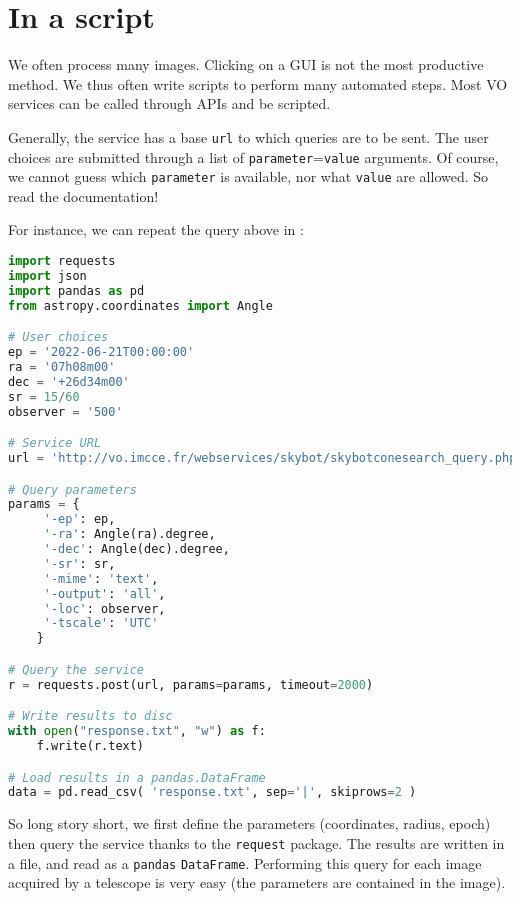 



\section{In a script}

We often process many images. Clicking on a GUI is not the most
productive method. We thus often write scripts to perform
many automated steps. Most VO services can be called through APIs
and be scripted.

Generally, the service has a base \texttt{url} to which queries are
to be sent. The user choices are submitted through a list of \texttt{parameter}=\texttt{value}
arguments. Of course, we cannot guess which \texttt{parameter} is
available, nor what \texttt{value} are allowed. So read the documentation!

For instance, we can repeat the query above in \python:

\begin{lstlisting}[language=python]
import requests
import json
import pandas as pd
from astropy.coordinates import Angle

# User choices
ep = '2022-06-21T00:00:00'
ra = '07h08m00'
dec = '+26d34m00'
sr = 15/60
observer = '500'

# Service URL
url = 'http://vo.imcce.fr/webservices/skybot/skybotconesearch_query.php?'

# Query parameters
params = {
     '-ep': ep,
     '-ra': Angle(ra).degree,
     '-dec': Angle(dec).degree,
     '-sr': sr,
     '-mime': 'text',
     '-output': 'all',
     '-loc': observer, 
     '-tscale': 'UTC'
    }

# Query the service
r = requests.post(url, params=params, timeout=2000)

# Write results to disc
with open("response.txt", "w") as f:
    f.write(r.text)

# Load results in a pandas.DataFrame
data = pd.read_csv( 'response.txt', sep='|', skiprows=2 )
\end{lstlisting}

  So long story short, we first
  define the parameters (coordinates, radius, epoch) then query the
  \skybot service thanks to the \texttt{request} package. The results
  are written in a file, and read as a \texttt{pandas} \texttt{DataFrame}.
  Performing this query for each image acquired by a telescope is very easy
  (the parameters are contained in the image).
